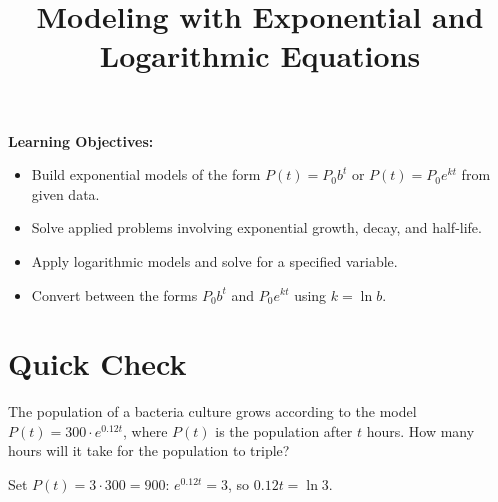 \documentclass{ximera}
\title{Modeling with Exponential and Logarithmic Equations}
\begin{document}
\begin{abstract}
\end{abstract}
\maketitle

\textbf{Learning Objectives:}
\begin{itemize}
  \item Build exponential models of the form $P(t)=P_0 b^t$ or $P(t)=P_0 e^{kt}$ from given data.
  \item Solve applied problems involving exponential growth, decay, and half-life.
  \item Apply logarithmic models and solve for a specified variable.
  \item Convert between the forms $P_0 b^t$ and $P_0 e^{kt}$ using $k=\ln b$.
\end{itemize}

\bigskip
\section*{Quick Check}

\begin{problem}
The population of a bacteria culture grows according to the model $P(t) = 300\cdot e^{0.12t}$, where $P(t)$ is the population after $t$ hours. How many hours will it take for the population to triple?
\begin{hint}
Set $P(t)=3\cdot300=900$: $e^{0.12t}=3$, so $0.12t=\ln 3$.
\end{hint}
\begin{multipleChoice}
\end{multipleChoice}
\end{problem}
\end{document}
